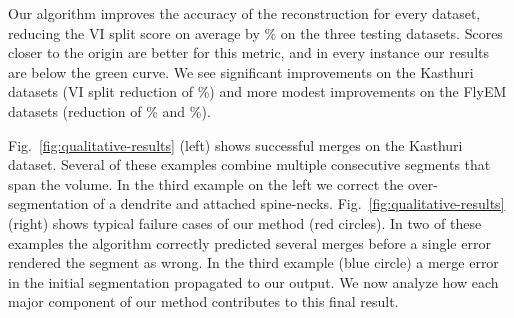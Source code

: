 Our algorithm improves the accuracy of the reconstruction for every dataset, reducing the VI split score on average by \% on the three testing datasets. 
Scores closer to the origin are better for this metric, and in every instance our results are below the green curve.
We see significant improvements on the Kasthuri datasets (VI split reduction of \%) and more modest improvements on the FlyEM datasets (reduction of \% and \%).

Fig.~\ref{fig:qualitative-results} (left) shows successful merges on the Kasthuri dataset. 
Several of these examples combine multiple consecutive segments that span the volume.
In the third example on the left we correct the over-segmentation of a dendrite and attached spine-necks.
Fig.~\ref{fig:qualitative-results} (right) shows typical failure cases of our method (red circles).
In two of these examples the algorithm correctly predicted several merges before a single error rendered the segment as wrong.
In the third example (blue circle) a merge error in the initial segmentation propagated to our output.
We now analyze how each major component of our method contributes to this final result.

